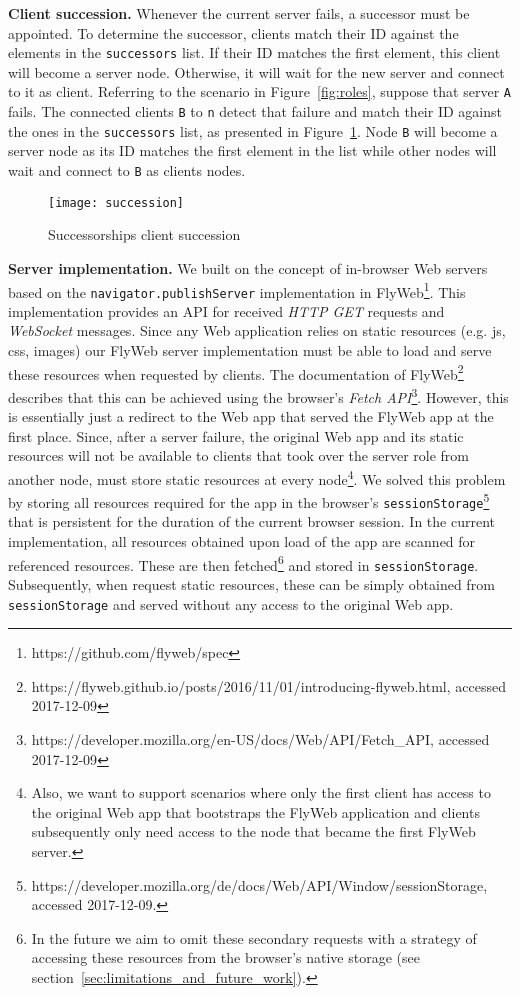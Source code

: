 \noindent\textbf{Client succession.} 
Whenever the current server fails, a successor must be appointed. 
To determine the successor, clients match their ID against the elements in the \texttt{successors} list.
If their ID matches the first element, this client will become a server node.
Otherwise, it will wait for the new server and connect to it as client.
Referring to the scenario in Figure~\ref{fig:roles}, suppose that server \texttt{A} fails. 
The connected clients \texttt{B} to \texttt{n} detect that failure and match their ID against the ones in the \texttt{successors} list, as presented in Figure~\ref{fig:succession}. Node \texttt{B} will become a server node as its ID matches the first element in the list while other nodes will wait and connect to \texttt{B} as clients nodes.

\begin{figure}[h]
    \centering
    \texttt{[image: succession]}
    \caption{Successorships client succession}
    \label{fig:succession}
\end{figure}

\noindent\textbf{Server implementation.}
We built on the concept of in-browser Web servers based on the \texttt{navigator.publishServer} implementation in FlyWeb\footnote{https://github.com/flyweb/spec}.
This implementation provides an API for received \textit{HTTP GET} requests and \textit{WebSocket} messages.
Since any Web application relies on static resources (e.g. js, css, images) our FlyWeb server implementation must be able to load and serve these resources when requested by clients.
The documentation of FlyWeb\footnote{https://flyweb.github.io/posts/2016/11/01/introducing-flyweb.html, accessed 2017-12-09} describes that this can be achieved using the browser's \textit{Fetch API}\footnote{https://developer.mozilla.org/en-US/docs/Web/API/Fetch\_API, accessed 2017-12-09}.
However, this is essentially just a redirect to the Web app that served the FlyWeb app at the first place.
Since, after a server failure, the original Web app and its static resources will not be available to clients that took over the server role from another node, \APIshort must store static resources at every node\footnote{Also, we want to support scenarios where only the first client has access to the original Web app that bootstraps the FlyWeb application and clients subsequently only need access to the node that became the first FlyWeb server.}.
We solved this problem by storing all resources required for the \APIshort app in the browser's \texttt{sessionStorage}\footnote{https://developer.mozilla.org/de/docs/Web/API/Window/sessionStorage, accessed 2017-12-09.} that is persistent for the duration of the current browser session.
In the current implementation, all resources obtained upon load of the app are scanned for referenced resources.
These are then fetched\footnote{In the future we aim to omit these secondary requests with a strategy of accessing these resources from the browser's native storage (see section~\ref{sec:limitations_and_future_work}).} and stored in \texttt{sessionStorage}.
Subsequently, when \APIshort request static resources, these can be simply obtained from \texttt{sessionStorage} and served without any access to the original Web app.



